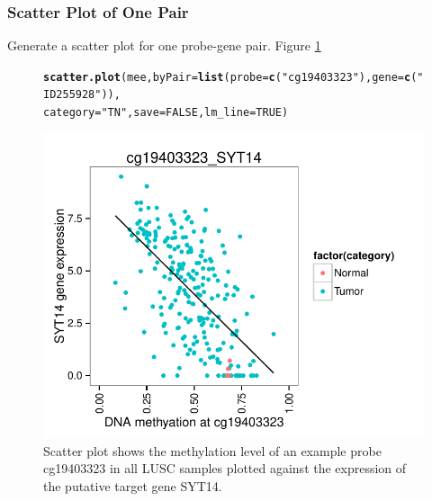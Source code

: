 \documentclass{article}\usepackage[]{graphicx}\usepackage[usenames,dvipsnames]{color}
\makeatletter
\def\maxwidth{ %
  \ifdim\Gin@nat@width>\linewidth
    \linewidth
  \else
    \Gin@nat@width
  \fi
}
\newcommand{\hlnum}[1]{\textcolor[rgb]{0.686,0.059,0.569}{#1}}%
\newcommand{\hlstr}[1]{\textcolor[rgb]{0.192,0.494,0.8}{#1}}%
\newcommand{\hlstd}[1]{\textcolor[rgb]{0.345,0.345,0.345}{#1}}%
\newcommand{\hlkwc}[1]{\textcolor[rgb]{0.333,0.667,0.333}{#1}}%
\newcommand{\hlkwd}[1]{\textcolor[rgb]{0.737,0.353,0.396}{\textbf{#1}}}%
\newenvironment{kframe}{%
 \def\at@end@of@kframe{}%
 \ifinner\ifhmode%
  \def\at@end@of@kframe{\end{minipage}}%
  \begin{minipage}{\columnwidth}%
 \fi\fi%
 \def\FrameCommand##1{\hskip\@totalleftmargin \hskip-\fboxsep
 \colorbox{shadecolor}{##1}\hskip-\fboxsep
     \hskip-\linewidth \hskip-\@totalleftmargin \hskip\columnwidth}%
 \MakeFramed {\advance\hsize-\width
   \@totalleftmargin\z@ \linewidth\hsize
   \@setminipage}}%
 {\par\unskip\endMakeFramed%
 \at@end@of@kframe}
\newenvironment{knitrout}{}{} %
\makeatother
\begin{document}
\subsubsection{Scatter Plot of One Pair}
Generate a scatter plot for one probe-gene pair. Figure \ref{fig:figure2}

\begin{figure}[H]
\begin{knitrout}
\color{fgcolor}\begin{kframe}
\begin{alltt}
\hlkwd{scatter.plot}\hlstd{(mee,}\hlkwc{byPair}\hlstd{=}\hlkwd{list}\hlstd{(}\hlkwc{probe}\hlstd{=}\hlkwd{c}\hlstd{(}\hlstr{"cg19403323"}\hlstd{),}\hlkwc{gene}\hlstd{=}\hlkwd{c}\hlstd{(}\hlstr{"ID255928"}\hlstd{)),}
             \hlkwc{category}\hlstd{=}\hlstr{"TN"}\hlstd{,} \hlkwc{save}\hlstd{=}\hlnum{FALSE}\hlstd{,}\hlkwc{lm_line}\hlstd{=}\hlnum{TRUE}\hlstd{)}
\end{alltt}
\end{kframe}

{\centering \includegraphics[width=\maxwidth]{figure/figure2-1} 

}



\end{knitrout}
\protect\caption{Scatter plot shows the methylation level of an example probe 
cg19403323 in all LUSC samples plotted against the expression of the putative 
target gene SYT14.
\label{fig:figure2}}
\end{figure}
\end{document}
